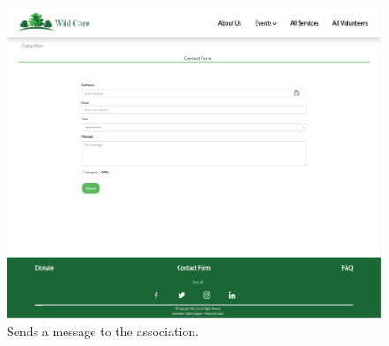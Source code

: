	\begin{figure}[h!]
		\centering
		\begin{minipage}[b]{1\textwidth}
    			\includegraphics[width=\textwidth]{./assets/mockups/contactform.png}
			\caption{Sends a message to the association.}
		\end{minipage}
	\end{figure}
